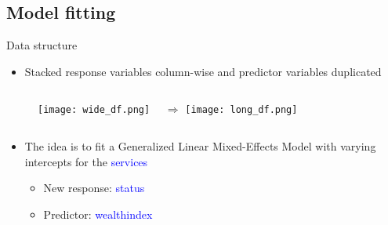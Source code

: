 \documentclass{beamer}
\begin{document}
\subsection{Model fitting}

\begin{frame}{Data structure}

\begin{itemize}[<+->]
\item Stacked response variables column-wise and predictor variables duplicated
\end{itemize}
\vspace{-1cm}
\begin{block}{}
\begin{figure}[H]
\centering
\begin{columns}[t]
\texttt{[image: wide\_df.png]}
\pause
{}
$\quad\Longrightarrow$
\pause
{}
\texttt{[image: long\_df.png]}
\end{columns}
\end{figure}
\vspace{-1cm}
\begin{itemize}[<+->]
\item The idea is to fit a Generalized Linear Mixed-Effects Model with varying intercepts for the \textcolor{blue}{services}

\begin{itemize}[<+->]
\item New response: \textcolor{blue}{status}
\item Predictor: \textcolor{blue}{wealthindex}
\end{itemize}
\end{itemize}
\end{block}
\end{frame}
\end{document}
